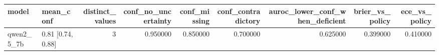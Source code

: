 \begin{tabular}{llrrrrrrr}
\toprule
model & mean\_conf & distinct\_values & conf\_no\_uncertainty & conf\_missing & conf\_contradictory & auroc\_lower\_conf\_when\_deficient & brier\_vs\_policy & ece\_vs\_policy \\
\midrule
qwen2\_5\_7b & 0.81 [0.74, 0.88] & 3 & 0.950000 & 0.850000 & 0.700000 & 0.625000 & 0.399000 & 0.410000 \\
\bottomrule
\end{tabular}
